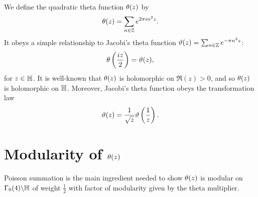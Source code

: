 \documentclass[12pt,reqno,oneside]{amsart}
\begin{document}
    We define the quadratic theta function $\theta(z)$ by
    \[
        \theta(z) = \sum_{n \in \mathbb{Z}}e^{2\pi in^{2}z}.
    \]
    It obeys a simple relationship to Jacobi's theta function $\vartheta(z) = \sum_{n \in \mathbb{Z}}e^{-\pi n^{2}z}$:
    \begin{equation}\label{equ:Jacobi_theta_relation}
        \theta\left(\frac{iz}{2}\right) = \vartheta(z),
    \end{equation}
    for $z \in \mathbb{H}$. It is well-known that $\theta(z)$ is holomorphic on $\Re(z) > 0$, and so $\theta(z)$ is holomorphic on $\mathbb{H}$. Moreover, Jacobi's theta function obeys the transformation law
    \begin{equation}\label{equ:Jacobi_transformation_law}
        \vartheta(z) = \frac{1}{\sqrt{z}}\vartheta\left(\frac{1}{z}\right).
    \end{equation}
\section{Modularity of \texorpdfstring{$\theta(z)$}{t(z)}}
    Poisson summation is the main ingredient needed to show $\theta(z)$ is modular on $\Gamma_{0}(4)\backslash\mathbb{H}$ of weight $\frac{1}{2}$ with factor of modularity given by the theta multiplier.
\end{document}
